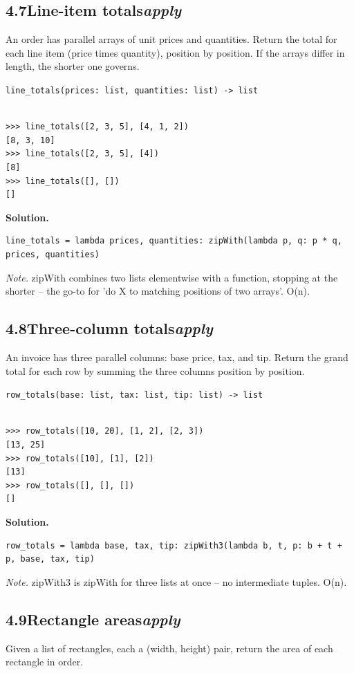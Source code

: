 \documentclass[10pt,letterpaper]{book}
\begin{document}
\subsection*{4.7\quad Line-item totals\hfill\textnormal{\textit{apply}}}
An order has parallel arrays of unit prices and quantities. Return the total for each line item (price times quantity), position by position. If the arrays differ in length, the shorter one governs.

\noindent\texttt{line\_totals(prices: list, quantities: list) -> list}
\begin{lstlisting}[style=ex]

>>> line_totals([2, 3, 5], [4, 1, 2])
[8, 3, 10]
>>> line_totals([2, 3, 5], [4])
[8]
>>> line_totals([], [])
[]

\end{lstlisting}
\noindent\textbf{Solution.}
\begin{lstlisting}[style=code]
line_totals = lambda prices, quantities: zipWith(lambda p, q: p * q, prices, quantities)
\end{lstlisting}
\noindent\textit{Note.} zipWith combines two lists elementwise with a function, stopping at the shorter -- the go-to for 'do X to matching positions of two arrays'. O(n).

\subsection*{4.8\quad Three-column totals\hfill\textnormal{\textit{apply}}}
An invoice has three parallel columns: base price, tax, and tip. Return the grand total for each row by summing the three columns position by position.

\noindent\texttt{row\_totals(base: list, tax: list, tip: list) -> list}
\begin{lstlisting}[style=ex]

>>> row_totals([10, 20], [1, 2], [2, 3])
[13, 25]
>>> row_totals([10], [1], [2])
[13]
>>> row_totals([], [], [])
[]

\end{lstlisting}
\noindent\textbf{Solution.}
\begin{lstlisting}[style=code]
row_totals = lambda base, tax, tip: zipWith3(lambda b, t, p: b + t + p, base, tax, tip)
\end{lstlisting}
\noindent\textit{Note.} zipWith3 is zipWith for three lists at once -- no intermediate tuples. O(n).

\subsection*{4.9\quad Rectangle areas\hfill\textnormal{\textit{apply}}}
Given a list of rectangles, each a (width, height) pair, return the area of each rectangle in order.
\end{document}
